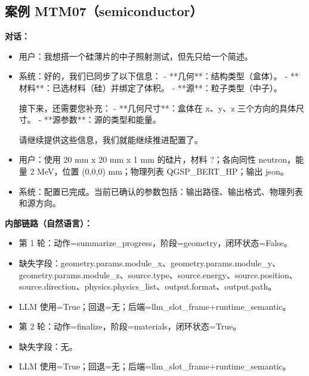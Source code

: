 \documentclass[11pt]{ctexart}
\begin{document}
\subsection{案例 MTM07（semiconductor）}
\textbf{对话：}
\begin{itemize}
\item 用户：我想搭一个硅薄片的中子照射测试，但先只给一个简述。
\item 系统：好的，我们已同步了以下信息：
- **几何**：结构类型（盒体）。
- **材料**：已选材料（硅）并绑定了体积。
- **源**：粒子类型（中子）。

接下来，还需要您补充：
- **几何尺寸**：盒体在 x、y、z 三个方向的具体尺寸。
- **源参数**：源的类型和能量。

请继续提供这些信息，我们就能继续推进配置了。
\item 用户：使用 20 mm x 20 mm x 1 mm 的硅片，材料 ?；各向同性 neutron，能量 2 MeV，位置 (0,0,0) mm；物理列表 QGSP\_BERT\_HP；输出 json。
\item 系统：配置已完成。当前已确认的参数包括：输出路径、输出格式、物理列表和源方向。
\end{itemize}
\textbf{内部链路（自然语言）：}
\begin{itemize}
\item 第 1 轮：动作=summarize\_progress，阶段=geometry，闭环状态=False。
\item 缺失字段：geometry.params.module\_x、geometry.params.module\_y、geometry.params.module\_z、source.type、source.energy、source.position、source.direction、physics.physics\_list、output.format、output.path。
\item LLM 使用=True；回退=无；后端=llm\_slot\_frame+runtime\_semantic。
\item 第 2 轮：动作=finalize，阶段=materials，闭环状态=True。
\item 缺失字段：无。
\item LLM 使用=True；回退=无；后端=llm\_slot\_frame+runtime\_semantic。
\end{itemize}
\end{document}
